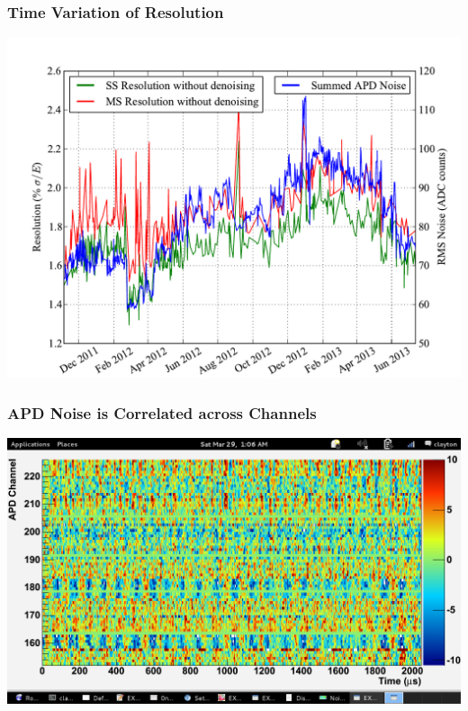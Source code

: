 \documentclass{beamer}
\begin{document}
\begin{frame}
\begin{center}
\frametitle{Time Variation of Resolution}
\end{center}
\vspace{1cm}
\includegraphics[keepaspectratio=true,width=\textwidth]{ResolutionAPDNoiseComparison.pdf}
\end{frame}


\begin{frame}
\begin{center}
\frametitle{APD Noise is Correlated across Channels}
\end{center}
\vspace{1cm}
\includegraphics[keepaspectratio=true,width=\textwidth,clip=true,trim=0mm 12mm 0mm 10mm]{Run4705Ev2_noiseEventDisplay.png}\\
\end{frame}
\end{document}

